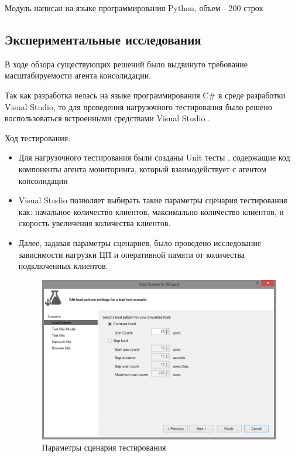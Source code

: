 \documentclass[russian, utf8, emptystyle]{eskdtext}
\begin{document}
Модуль написан на языке программирования Python, объем - 200 строк
\subsection{Экспериментальные исследования}
В ходе обзора существующих решений было выдвинуто требование масштабируемости агента консолидации.

	
Так как разработка велась на языке программирования C\# в среде разработки Visual Studio, то для проведения нагрузочного тестирования было решено воспользоваться встроенными средствами Visual Studio \cite{test}.

Ход тестирования:
\begin{itemize}
	\item Для нагрузочного тестирования были созданы Unit тесты \cite{unitTest}, содержащие код компоненты агента мониторинга, который взаимодействует с агентом консолидации
	\item Visual Studio позволяет выбирать такие параметры сценария тестирования как: начальное количество клиентов, максимально количество клиентов, и скорость увеличения
	количества клиентов.
	\item Далее, задавая параметры сценариев, было проведено исследование зависимости нагрузки ЦП и оперативной памяти от количества подключенных клиентов.
	 \begin{figure}[h]
	 	\begin{center}
	 		\includegraphics[width=14cm]{pic/test.png}
	 		\caption{Параметры сценария тестирования}
	 		\label{fig:low_sigma}
	 	\end{center}
	 \end{figure}
\end{itemize}
\end{document}
